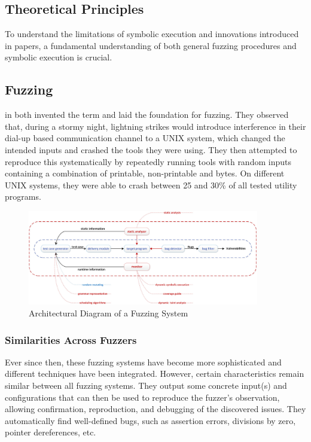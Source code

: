 \documentclass{article}
\begin{document}
\begin{multicols}{2}
    \section{Theoretical Principles}
    \label{Theory}

    To understand the limitations of symbolic execution and innovations introduced in papers, a fundamental understanding of both general fuzzing procedures and symbolic execution is crucial.

    \subsection{Fuzzing}

    \citeauthor{UNIX} in \citeyear{UNIX} both invented the term and laid the foundation for fuzzing. They observed that, during a stormy night, lightning strikes would introduce interference in their dial-up based communication channel to a UNIX system, which changed the intended inputs and crashed the tools they were using. They then attempted to reproduce this systematically by repeatedly running tools with random inputs containing a combination of printable, non-printable and  bytes. On different UNIX systems, they were able to crash between 25 and 30\% of all tested utility programs.\cite{UNIX}

    \begin{figure}[!tp]
        \centering
        \includegraphics[width=0.9\textwidth]{assets/FuzzingSteps.jpg}
        \caption{Architectural Diagram of a Fuzzing System\cite{Science}}
        \label{fig:FuzzingSteps}
    \end{figure}

    \subsubsection{Similarities Across Fuzzers}
    Ever since then, these fuzzing systems have become more sophisticated and different techniques have been integrated. However, certain characteristics remain similar between all fuzzing systems. They output some concrete input(s) and configurations that can then be used to reproduce the fuzzer's observation, allowing confirmation, reproduction, and debugging of the discovered issues.\cite{EvaluatingFuzzTesting} They automatically find well-defined bugs, such as assertion errors, divisions by zero,  pointer dereferences, etc.\cite{AllYouEverWanted}


\end{multicols}
\end{document}
